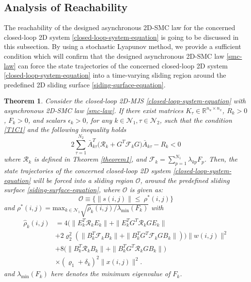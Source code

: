 \documentclass[conference]{IEEEtran}
\newtheorem{theorem}{Theorem}
\begin{document}
\subsection{Analysis of Reachability}\label{minimization} 
	 The reachability of the  designed asynchronous 2D-SMC law for the concerned closed-loop 2D system \eqref{closed-loop-system-equation} is going to be discussed in this subsection. By using a stochastic Lyapunov method, we provide a sufficient condition which will confirm that the designed asynchronous 2D-SMC law \eqref{smc-law} can force the state trajectories of the concerned closed-loop 2D system \eqref{closed-loop-system-equation} into a time-varying sliding region around the predefined 2D sliding surface \eqref{siding-surface-equation}.
	 

\begin{theorem}\label{theorem2}	
	Consider the closed-loop 2D-MJS \eqref{closed-loop-system-equation} with asynchronous 2D-SMC law \eqref{smc-law}. If there exist matrices $K_{\tau }\in\mathbb{R}^{n_u\times n_x}$, $R_{k}>0$, $F_{k}>0$, and  scalars $\epsilon_{k}>0$, for any $k\in\mathcal{N}_{1}, \tau\in\mathcal{N}_{2}$, such that the condition \eqref{T1C1} and the following inequality holds
	\begin{equation} \label{T2C1}
		2\sum_{\tau =1}^{N_{2}} \bar{A}^{T}_{k\tau }\big(\mathcal{R}_{k}+G^{T}\mathcal{F}_{k}G\big)\bar{A}_{k\tau }-R_{k} <0
	\end{equation}
	where $\mathcal{R}_{k}$ is defined in Theorem \ref{theorem1}, and $\mathcal{F}_{k}=\sum_{p=1}^{N_{1}}\lambda_{kp}F_{p}$. Then, the state trajectories of the concerned closed-loop 2D system \eqref{closed-loop-system-equation} will be forced into a sliding region $\mathcal{O}$, around the predefined sliding surface \eqref{siding-surface-equation}, where  $\mathcal{O}$ is given as:
	\begin{equation}\label{smc-region}
		\mathcal{O}\equiv\Big\{\|s(i,j)\|\leq\ \rho^{*}(i,j) \Big\}
	\end{equation} 
	and $\rho^{*}(i,j) = \mathrm{max}_{k\in\mathcal{N}_{1}}\sqrt{\hat{\rho}_{k}(i,j)/
	\lambda_{\mathrm{min}}(F_{k})}$ with
	\begin{equation*}
		 \begin{split}
		 	\hat{\rho}_{k}(i,j)&=4\big(\|E^{T}_{k}\mathcal{R}_{k}E_{k}\|+ \|E^{T}_{k}G^{T}\mathcal{R}_{k}GE_{k}\|\\
		 	&+2\varrho_{2}^{2}(\|B^{T}_{k}\mathcal{F}_{k}B_{k}\|+ \|B^{T}_{k}G^{T}\mathcal{F}_{k}GB_{k}\| )\big)\|w(i,j)\|^{2}\\
		 	&+8\big(\|B^{T}_{k}\mathcal{R}_{k}B_{k}\|+\|B^{T}_{k}G^{T}\mathcal{R}_{k}GB_{k}\|\big)\\ &\times(\varrho_{1}+\delta_{k})^{2}\|x(i,j)\|^{2}.
		 \end{split}
	\end{equation*}
	and $\lambda_{\mathrm{min}}(F_{k})$ here denotes the minimum eigenvalue of $F_{k}$.
\end{theorem} 
\end{document}
